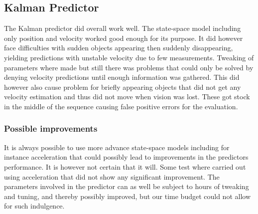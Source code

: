 \subsection{Kalman Predictor}
The Kalman predictor did overall work well. The state-space model including only position and velocity worked good enough for its purpose. It did however face difficulties with sudden objects appearing then suddenly disappearing, yielding predictions with unstable velocity due to few measurements. Tweaking of parameters
where made but still there was problems that could only be solved by denying velocity predictions until enough information was gathered. This did however also cause problem for briefly appearing objects that did not get any velocity estimation and thus did not move when vision was lost. These got stock in the middle of the sequence causing false positive errors for the evaluation.

\subsubsection{Possible improvements}
It is always possible to use more advance state-space models including for instance acceleration that could possibly lead to improvements in the predictors performance. It is however not certain that it will. Some test where carried out using acceleration that did not show any significant improvement. The parameters involved in the predictor can as well be subject to hours of tweaking and tuning, and thereby possibly improved, but our time budget could not allow for such indulgence. 

















